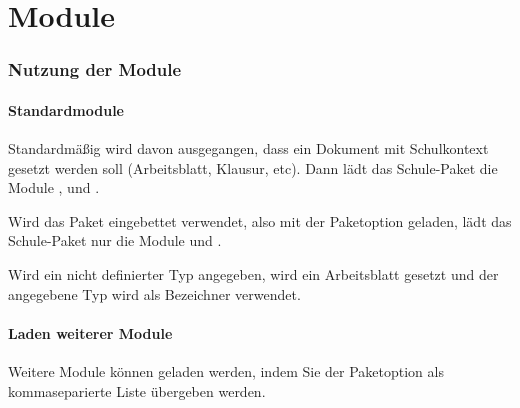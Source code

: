 \part{Module}
    \label{sec:module}
    \section{Nutzung der Module}
        \subsection{Standardmodule}
        Standardmäßig wird davon ausgegangen, dass ein Dokument mit Schulkontext gesetzt werden soll (Arbeitsblatt, Klausur, etc). Dann lädt das Schule-Paket die Module ,  und .

        Wird das Paket eingebettet verwendet, also mit der Paketoption  geladen, lädt das Schule-Paket nur die Module  und .

        Wird ein nicht definierter Typ angegeben, wird ein Arbeitsblatt gesetzt und der angegebene Typ wird als Bezeichner verwendet.

        \subsection{Laden weiterer Module}
        \begin{options}
            \Default Weitere Module können geladen werden, indem Sie der Paketoption  als kommaseparierte Liste übergeben werden.
        \end{options}

    
    
    
    
    
    
    
    
    